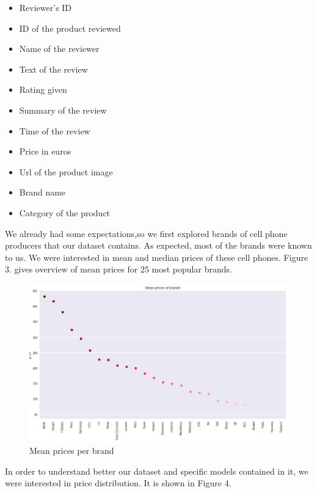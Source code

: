 \documentclass[11pt]{article}
\begin{document}
\begin{itemize}
  \item Reviewer's ID
  \item ID of the product reviewed
  \item Name of the reviewer
  \item Text of the review
  \item Rating given
  \item Summary of the review
  \item Time of the review
  \item Price in euros
  \item Url of the product image
  \item Brand name
  \item Category of the product
\end{itemize}

We already had some expectations,so we first explored brands of cell phone producers that our dataset contains. As expected, most of the brands were known to us. We were interested in mean and median prices of these cell phones. Figure 3. gives overview of mean prices for 25 most popular brands.   

\begin{figure}[h!]
  \centering
    \includegraphics[width=\linewidth]{meanPrices.png}
  \caption{Mean prices per brand}
  \label{fig:meanPricePerBrand}
\end{figure}

In order to understand better our dataset and specific models contained in it, we were interested in price distribution. It is shown in Figure 4. 
\end{document}
